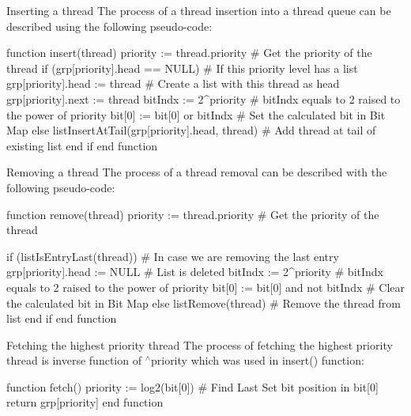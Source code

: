 \begin{DoxyParagraph}{Inserting a thread}
The process of a thread insertion into a thread queue can be described using the following pseudo-\/code\-: 
\begin{DoxyCode}
\textcolor{keyword}{function} insert(thread)
    priority := thread.priority                             \textcolor{preprocessor}{# Get the priority of the thread}
\textcolor{preprocessor}{}    
    \textcolor{keywordflow}{if} (grp[priority].head == NULL)                         # If \textcolor{keyword}{this} priority level has a list
        grp[priority].head := thread                        # Create a list with \textcolor{keyword}{this} thread as head
        grp[priority].next := thread
        bitIndx := 2^priority                               # bitIndx equals to 2 raised to the power of 
      priority
        bit[0]  := bit[0] or bitIndx                        # Set the calculated bit in Bit Map
    \textcolor{keywordflow}{else}
        listInsertAtTail(grp[priority].head, thread)        \textcolor{preprocessor}{# Add thread at tail of existing list}
\textcolor{preprocessor}{}    end \textcolor{keywordflow}{if}
end \textcolor{keyword}{function}
\end{DoxyCode}

\end{DoxyParagraph}
\begin{DoxyParagraph}{Removing a thread}
The process of a thread removal can be described with the following pseudo-\/code\-: 
\begin{DoxyCode}
\textcolor{keyword}{function} \textcolor{keyword}{remove}(thread)
    priority := thread.priority                             # Get the priority of the thread
    
    if (listIsEntryLast(thread))                            # In \textcolor{keywordflow}{case} we are removing the last entry
        grp[priority].head := NULL                          # List is deleted
        bitIndx := 2^priority                               # bitIndx equals to 2 raised to the power of 
      priority
        bit[0]  := bit[0] and not bitIndx                   # Clear the calculated bit in Bit Map
    \textcolor{keywordflow}{else}
        listRemove(thread)                                  # Remove the thread from list
    end \textcolor{keywordflow}{if}
end \textcolor{keyword}{function}
\end{DoxyCode}

\end{DoxyParagraph}
\begin{DoxyParagraph}{Fetching the highest priority thread}
The process of fetching the highest priority thread is inverse function of {$^\wedge$priority} which was used in {\ttfamily insert()} function\-: 
\begin{DoxyCode}
\textcolor{keyword}{function} fetch()
    priority := log2(bit[0])                                \textcolor{preprocessor}{# Find Last Set bit position in bit[0]}
\textcolor{preprocessor}{}
    \textcolor{keywordflow}{return} grp[priority]
end \textcolor{keyword}{function}
\end{DoxyCode}

\end{DoxyParagraph}
